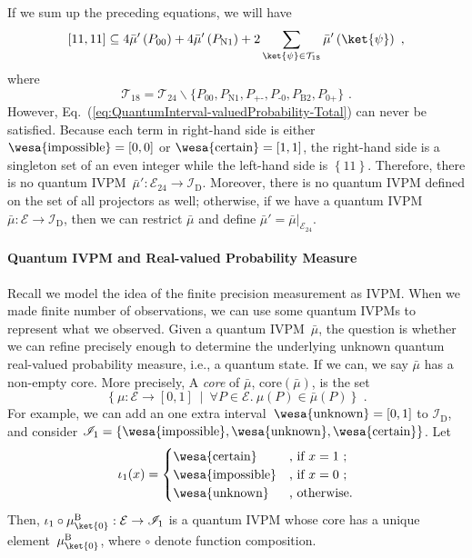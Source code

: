 \documentclass[english,reprint, aps, prl,superscriptaddress, showpacs,
showkeys, longbibliography, amsmath, amssymb]{revtex4-1}
\theoremstyle{plain}
\theoremstyle{definition}
\newcommand{\events}{\ensuremath{\mathcal{E}}}
\newcommand{\pmeas}{\ensuremath{\mu}}
\newcommand{\imposs}{{\text{\wesa{impossible}}}}
\newcommand{\necess}{{\text{\wesa{certain}}}}
\newcommand{\unknown}{{\text{\wesa{unknown}}}}
\newcommand{\ps}{\texttt{+}}
\newcommand{\ms}{\texttt{-}}
\newcommand{\set}[2]{\ensuremath{\left\{ {#1}~\middle|~{#2}\right\} }}
\begin{document}
If we sum up the preceding equations, we will have
\begin{equation}
\left[11,11\right]\subseteq4\bar{\mu}'\left(P_{00}\right)+4\bar{\mu}'\left(P_{\textrm{N}1}\right)+2\sum_{\ket{\psi}\in\mathcal{T}_{18}}\bar{\mu}'\left(\ket{\psi}\right)\textrm{ ,}\label{eq:QuantumInterval-valuedProbability-Total}
\end{equation}
where 
\begin{equation}
\mathcal{T}_{18}=\mathcal{T}_{24}\backslash\{P_{00},P_{\textrm{N}1},P_{\ps\ms},P_{\ms0},P_{\textrm{B}2},P_{0\ps}\}\textrm{ .}
\end{equation}
However, Eq.~(\ref{eq:QuantumInterval-valuedProbability-Total})
can never be satisfied. Because each term in right-hand side is either
$\imposs=\left[0,0\right]$ or $\necess=\left[1,1\right]$, the right-hand
side is a singleton set of an even integer while the left-hand side
is $\left\{ 11\right\} $. Therefore, there is no quantum IVPM~$\bar{\mu}':\events_{24}\rightarrow\mathscr{I}_{\mathrm{D}}$.
Moreover, there is no quantum IVPM defined on the set of all projectors
as well; otherwise, if we have a quantum IVPM~$\bar{\mu}:\events\rightarrow\mathscr{I}_{\mathrm{D}}$,
then we can restrict $\bar{\mu}$ and define $\bar{\mu}'=\left.\bar{\mu}\right|_{\events_{24}}$.

\paragraph{Quantum IVPM and Real-valued Probability Measure}

Recall we model the idea of the finite precision measurement as IVPM.
When we made finite number of observations, we can use some quantum
IVPMs to represent what we observed. Given a quantum IVPM~$\bar{\mu}$,
the question is whether we can refine precisely enough to determine
the underlying unknown quantum real-valued probability measure, i.e.,
a quantum state. If we can, we say $\bar{\mu}$ has a non-empty core.
More precisely, A \emph{core} of $\bar{\mu}$, $\mathrm{core}\left(\bar{\mu}\right)$,
is the set 
\begin{equation}
\set{\pmeas:\events\rightarrow[0,1]}{\forall P\in\events.~\pmeas\left(P\right)\in\bar{\mu}\left(P\right)}\textrm{ .}
\end{equation}
For example, we can add an one extra interval~$\unknown=\left[0,1\right]$
to $\mathscr{I}_{\mathrm{D}}$, and consider $\mathscr{I}_{1}=\left\{ \imposs,\unknown,\necess\right\} $.
Let 
\begin{equation}
\iota_{1}(x)=\begin{cases}
\necess & \text{, if }x=1\text{ ;}\\
\imposs & \text{, if }x=0\text{ ;}\\
\unknown & \text{, otherwise.}
\end{cases}\label{eq:homomorphism-1}
\end{equation}
Then, $\iota_{1}\circ\mu_{\ket{0}}^{\mathrm{B}}:\events\rightarrow\mathscr{I}_{1}$
is a quantum IVPM whose core has a unique element~$\mu_{\ket{0}}^{\mathrm{B}}$,
where $\circ$ denote function composition.
\end{document}
